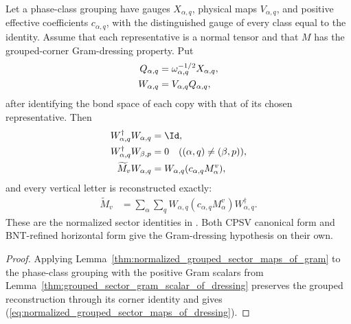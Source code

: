 \begin{lemma}
    \label{thm:normalized_grouped_sector_maps_of_dressing}
    \leanok
    Let a phase-class grouping have gauges $X_{\alpha,q}$, physical maps
    $V_{\alpha,q}$, and positive effective coefficients $c_{\alpha,q}$, with
    the distinguished gauge of every class equal to the identity. Assume that
    each representative is a normal tensor and that $M$ has the
    grouped-corner Gram-dressing property. Put
    \begin{align}
        Q_{\alpha,q}
         & =\omega_{\alpha,q}^{-1/2}X_{\alpha,q},
        \notag                                    \\
        W_{\alpha,q}
         & =V_{\alpha,q}Q_{\alpha,q},
        \notag
    \end{align}
    after identifying the bond space of each copy with that of its chosen
    representative. Then
    \begin{align}
        W_{\alpha,q}^\dagger W_{\alpha,q} & =\Id,
        \notag                                                                     \\
        W_{\alpha,q}^\dagger W_{\beta,p}  & =0
        \quad((\alpha,q)\ne(\beta,p)),
        \notag                                                                     \\
        \widetilde M_vW_{\alpha,q}
                                          & =W_{\alpha,q}(c_{\alpha,q}M_\alpha^v),
        \notag
    \end{align}
    and every vertical letter is reconstructed exactly:
    \begin{align}
        \widetilde M_v
         & =\sum_\alpha\sum_q
        W_{\alpha,q}(c_{\alpha,q}M_\alpha^v)
        W_{\alpha,q}^\dagger.
        \label{eq:normalized_grouped_sector_maps_of_dressing}
    \end{align}
    These are the normalized sector identities in
    \cite[Proposition~4.13, lines~1895--1921]{Cirac2016MPDO_arXiv}. Both
    CPSV canonical form and BNT-refined horizontal form give
    the Gram-dressing hypothesis on their own.
\end{lemma}

\begin{proof}
    \leanok
    Applying Lemma~\ref{thm:normalized_grouped_sector_maps_of_gram} to the
    phase-class grouping with the positive Gram scalars from
    Lemma~\ref{thm:grouped_sector_gram_scalar_of_dressing} preserves the
    grouped reconstruction through its corner identity and gives
    (\ref{eq:normalized_grouped_sector_maps_of_dressing}).
\end{proof}
